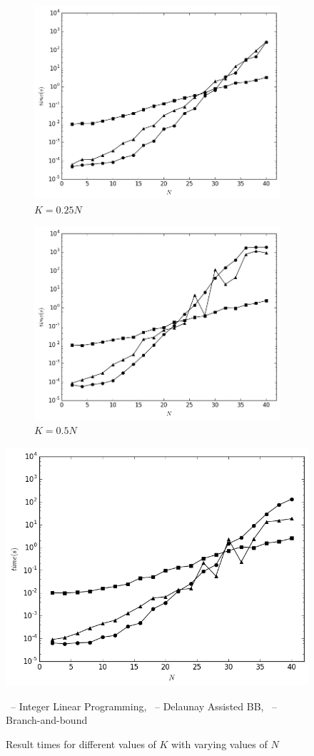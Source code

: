 \begin{figure}[H] 
	\begin{subfigure}[b]{0.5\linewidth}
		\centering
		\includegraphics[width=0.9\linewidth]{Pictures/k1} 
		\caption{$K=0.25N$} 
		\label{fig:fixed_k:a} 
		\vspace{4ex}
	\end{subfigure}%
	\begin{subfigure}[b]{0.5\linewidth}
		\centering
		\includegraphics[width=0.9\linewidth]{Pictures/k2} 
		\caption{$K=0.5N$} 
		\label{fig:fixed_k:b} 
		\vspace{4ex}
	\end{subfigure} 
		\centering
		\includegraphics[width=0.45\linewidth]{Pictures/k3} 
		\caption{$K=0.75N$} 
		\label{fig:fixed_k:c} 
	\vspace{2ex}
	\smark\ -- Integer Linear Programming, \tmark\ -- Delaunay Assisted BB, \cmark\ -- Branch-and-bound
	\caption{Result times for different values of $K$ with varying values of $N$}
	\label{fig:fixed_k} 
\end{figure}

